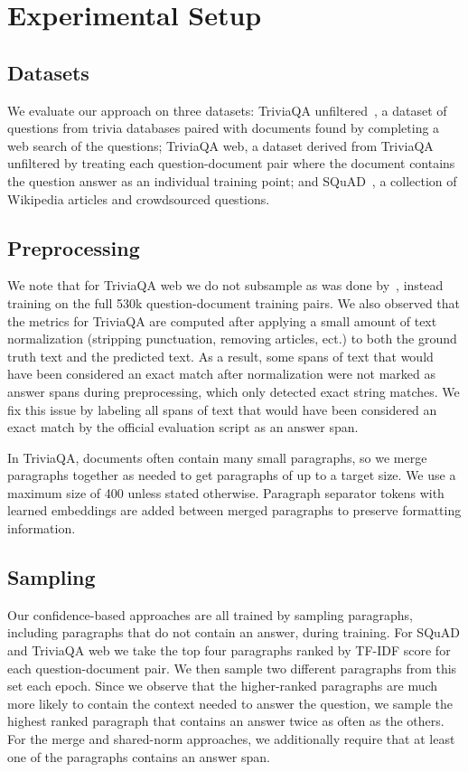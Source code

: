 \documentclass[11pt,a4paper]{article}
\begin{document}
\section{Experimental Setup}
\subsection{Datasets}
We evaluate our approach on three datasets: TriviaQA unfiltered~\cite{triviaqa}, a dataset of questions from trivia databases paired with documents found by completing a web search of the questions; TriviaQA web, a dataset derived from TriviaQA unfiltered by treating each question-document pair where the document contains the question answer as an individual training point; and SQuAD~\cite{squad}, a collection of Wikipedia articles and crowdsourced questions. 

\subsection{Preprocessing}
We note that for TriviaQA web we do not subsample as was done by~\citet{triviaqa}, instead training on the full 530k question-document training pairs. We also observed that the metrics for TriviaQA are computed after applying a small amount of text normalization (stripping punctuation, removing articles, ect.) to both the ground truth text and the predicted text. As a result, some spans of text that would have been considered an exact match after normalization were not marked as answer spans during preprocessing, which only detected exact string matches. We fix this issue by labeling all spans of text that would have been considered an exact match by the official evaluation script as an answer span.

In TriviaQA, documents often contain many small paragraphs, so we merge paragraphs together as needed to get paragraphs of up to a target size. We use a maximum size of 400 unless stated otherwise. Paragraph separator tokens with learned embeddings are added between merged paragraphs to preserve formatting information.

\subsection{Sampling}
Our confidence-based approaches are all trained by sampling paragraphs, including paragraphs that do not contain an answer, during training. For SQuAD and TriviaQA web we take the top four paragraphs ranked by TF-IDF score for each question-document pair. We then sample two different paragraphs from this set each epoch. Since we observe that the higher-ranked paragraphs are much more likely to contain the context needed to answer the question, we sample the highest ranked paragraph that contains an answer twice as often as the others. For the merge and shared-norm approaches, we additionally require that at least one of the paragraphs contains an answer span. 
\end{document}
